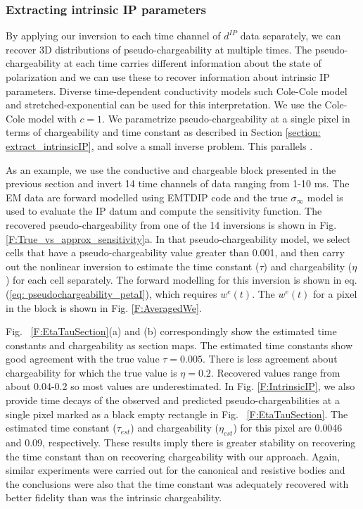 \documentclass[extra,mreferee]{gji}
\newcommand{\siginf}{\sigma_\infty}
\newcommand{\dip}{d^{IP}}
\begin{document}
\subsubsection{Extracting intrinsic IP parameters}
By applying our inversion to each time channel of $\dip$ data separately, we can recover 3D distributions of pseudo-chargeability at multiple times. 
The pseudo-chargeability at each time carries different information about the state of polarization and we can use these to recover information about intrinsic IP parameters. 
Diverse time-dependent conductivity models such Cole-Cole model and stretched-exponential can be used for this interpretation.
We use the Cole-Cole model with $c=1$. 
We parametrize pseudo-chargeability at a single pixel in terms of chargeability and time constant as described in Section \ref{section: extract_intrinsicIP}, and solve a small inverse problem. This parallels \cite[]{Yuval1997,Hordt2006}.

As an example, we use the conductive and chargeable block presented in the previous section and invert 14 time channels of data ranging from 1-10 ms.  The EM data are forward modelled using EMTDIP code and the true $\siginf$ model is used  to evaluate the IP datum and compute the sensitivity function. The recovered pseudo-chargeability from one of the 14 inversions is shown in Fig. \ref{F:True_vs_approx_sensitivity}a. In that pseudo-chargeability model, we select cells that have a pseudo-chargeability value greater than 0.001, and then carry out the nonlinear inversion to estimate the time constant ($\tau$) and chargeability ($\eta$) for each cell separately. The forward modelling for this inversion is shown in eq. (\ref{eq: pseudochargeability_petaI}), which requires $w^e(t)$. 
The $w^e(t)$ for a pixel in the block is shown in Fig. \ref{F:AveragedWe}.

Fig. ~\ref{F:EtaTauSection}(a) and (b) correspondingly show the estimated time constants and chargeability as section maps.
The estimated time constants show good agreement with the true value $\tau= 0.005$. 
There is less agreement about chargeability for which the true value is $\eta=0.2$. Recovered values range from about 0.04-0.2 so most values are underestimated. 
In Fig. \ref{F:IntrinsicIP}, we also provide time decays of the observed and predicted pseudo-chargeabilities at a single pixel marked as a black empty rectangle in Fig. ~\ref{F:EtaTauSection}. The estimated time constant ($\tau_{est}$) and chargeability ($\eta_{est}$) for this pixel are 0.0046 and 0.09, respectively. 
These results imply there is greater  stability on recovering the time constant than on recovering chargeability with our approach. Again, similar experiments were carried out for the canonical and resistive bodies and the conclusions were also that the time constant was adequately recovered with better fidelity than was the intrinsic chargeability.  
\end{document}
